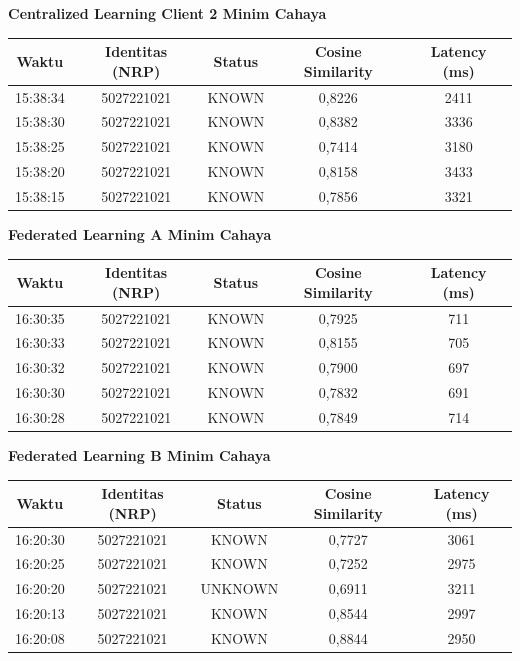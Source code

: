 \noindent\textbf{Centralized Learning Client 2 Minim Cahaya}
\begin{center}
  \small
  \begin{tabular}{|c|c|c|c|c|}
    \hline
    \textbf{Waktu} & \textbf{Identitas (NRP)} & \textbf{Status} & \textbf{Cosine Similarity} & \textbf{Latency (ms)} \\
    \hline
    15:38:34 & 5027221021 & KNOWN & 0,8226 & 2411 \\
    15:38:30 & 5027221021 & KNOWN & 0,8382 & 3336 \\
    15:38:25 & 5027221021 & KNOWN & 0,7414 & 3180 \\
    15:38:20 & 5027221021 & KNOWN & 0,8158 & 3433 \\
    15:38:15 & 5027221021 & KNOWN & 0,7856 & 3321 \\
    \hline
  \end{tabular}
\end{center}

\noindent\textbf{Federated Learning A Minim Cahaya}
\begin{center}
  \small
  \begin{tabular}{|c|c|c|c|c|}
    \hline
    \textbf{Waktu} & \textbf{Identitas (NRP)} & \textbf{Status} & \textbf{Cosine Similarity} & \textbf{Latency (ms)} \\
    \hline
    16:30:35 & 5027221021 & KNOWN & 0,7925 & 711 \\
    16:30:33 & 5027221021 & KNOWN & 0,8155 & 705 \\
    16:30:32 & 5027221021 & KNOWN & 0,7900 & 697 \\
    16:30:30 & 5027221021 & KNOWN & 0,7832 & 691 \\
    16:30:28 & 5027221021 & KNOWN & 0,7849 & 714 \\
    \hline
  \end{tabular}
\end{center}

\noindent\textbf{Federated Learning B Minim Cahaya}
\begin{center}
  \small
  \begin{tabular}{|c|c|c|c|c|}
    \hline
    \textbf{Waktu} & \textbf{Identitas (NRP)} & \textbf{Status} & \textbf{Cosine Similarity} & \textbf{Latency (ms)} \\
    \hline
    16:20:30 & 5027221021 & KNOWN & 0,7727 & 3061 \\
    16:20:25 & 5027221021 & KNOWN & 0,7252 & 2975 \\
    16:20:20 & 5027221021 & UNKNOWN & 0,6911 & 3211 \\
    16:20:13 & 5027221021 & KNOWN & 0,8544 & 2997 \\
    16:20:08 & 5027221021 & KNOWN & 0,8844 & 2950 \\
    \hline
  \end{tabular}
\end{center}

